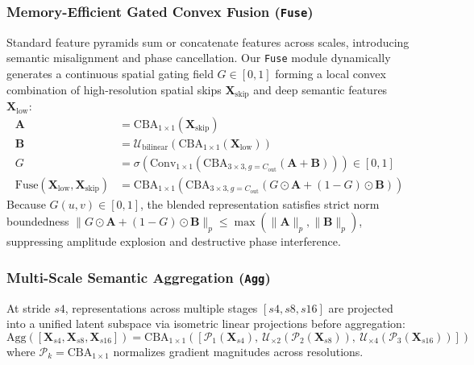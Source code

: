 \documentclass[11pt,a4paper]{article}
\begin{document}
\subsubsection{Memory-Efficient Gated Convex Fusion (\texttt{Fuse})}
Standard feature pyramids sum or concatenate features across scales, introducing semantic misalignment and phase cancellation. Our \texttt{Fuse} module dynamically generates a continuous spatial gating field $G \in [0, 1]$ forming a local convex combination of high-resolution spatial skips $\mathbf{X}_{\text{skip}}$ and deep semantic features $\mathbf{X}_{\text{low}}$:
\begin{align}
\mathbf{A} &= \text{CBA}_{1\times 1}(\mathbf{X}_{\text{skip}}) \\
\mathbf{B} &= \mathcal{U}_{\text{bilinear}}\left( \text{CBA}_{1\times 1}(\mathbf{X}_{\text{low}}) \right) \\
G &= \sigma\left( \text{Conv}_{1\times 1}\left( \text{CBA}_{3\times 3, g=C_{\text{out}}}(\mathbf{A} + \mathbf{B}) \right) \right) \in [0, 1] \\
\text{Fuse}(\mathbf{X}_{\text{low}}, \mathbf{X}_{\text{skip}}) &= \text{CBA}_{1\times 1}\left( \text{CBA}_{3\times 3, g=C_{\text{out}}}(G \odot \mathbf{A} + (1 - G) \odot \mathbf{B}) \right)
\end{align}
Because $G(u, v) \in [0, 1]$, the blended representation satisfies strict norm boundedness $\|G \odot \mathbf{A} + (1 - G) \odot \mathbf{B}\|_p \le \max(\|\mathbf{A}\|_p, \|\mathbf{B}\|_p)$, suppressing amplitude explosion and destructive phase interference.

\subsubsection{Multi-Scale Semantic Aggregation (\texttt{Agg})}
At stride $s4$, representations across multiple stages $[s4, s8, s16]$ are projected into a unified latent subspace via isometric linear projections before aggregation:
\begin{equation}
\text{Agg}\left([\mathbf{X}_{s4}, \mathbf{X}_{s8}, \mathbf{X}_{s16}]\right) = \text{CBA}_{1\times 1}\left(\left[\mathcal{P}_1(\mathbf{X}_{s4}), \ \mathcal{U}_{\times 2}(\mathcal{P}_2(\mathbf{X}_{s8})), \ \mathcal{U}_{\times 4}(\mathcal{P}_3(\mathbf{X}_{s16}))\right]\right)
\end{equation}
where $\mathcal{P}_k = \text{CBA}_{1\times 1}$ normalizes gradient magnitudes across resolutions.
\end{document}
